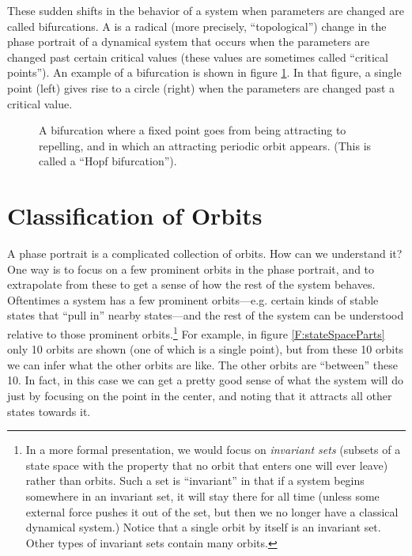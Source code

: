 These sudden shifts in the behavior of a system when parameters are changed are called bifurcations. A  is a radical (more precisely, ``topological'') change in the phase portrait of a dynamical system that occurs when the parameters are changed past certain critical values (these values are sometimes called ``critical points''). An example of a bifurcation is shown in figure \ref{F:bifurcation}. In that figure, a single point (left) gives rise to a circle (right) when the parameters are changed past a critical value.

\begin{figure}[h]
\centering
{}
\caption[Scott Hotton.]{A bifurcation where a fixed point goes from being
attracting to repelling, and in which an attracting periodic orbit appears.
(This is called a ``Hopf bifurcation''). }
\label{F:bifurcation}
\end{figure}

\section{Classification of Orbits}


A phase portrait is a complicated collection of orbits. How can we understand it?  One way is to focus on a few prominent orbits in the phase portrait, and to extrapolate from these to get a sense of how the rest of the system behaves. Oftentimes a system has a few prominent orbits---e.g. certain kinds of stable states that ``pull in'' nearby states---and the rest of the system can be understood relative to those prominent orbits.\footnote{In a more formal presentation, we would focus on \emph{invariant sets} (subsets of a state space with the property that no orbit that enters one will ever leave) rather than orbits. Such a set is ``invariant'' in that if a system begins somewhere in an invariant set, it will stay there for all time (unless some external force pushes it out of the set, but then we no longer have a classical dynamical system.) Notice that a single orbit by itself is an invariant set. Other types of invariant sets contain many orbits.}  For example, in figure \ref{F:stateSpaceParts} only 10 orbits are shown (one of which is a single point), but from these 10 orbits we can infer what the other orbits are like. The other orbits are ``between'' these 10. In fact, in this case we can get a pretty good sense of what the system will do just by focusing on the point in the center, and noting that it attracts all other states towards it.

